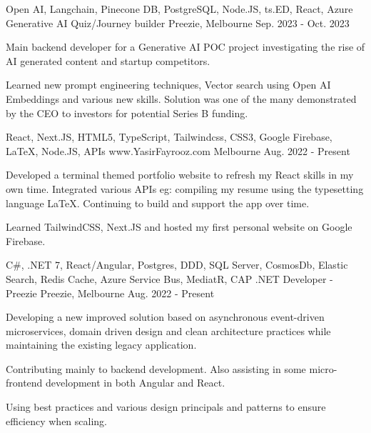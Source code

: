 

\vspace{-0.5\baselineskip}
\begin{cventries}
  \cventry
    {Open AI, Langchain, Pinecone DB, PostgreSQL, Node.JS, ts.ED, React, Azure}
    {Generative AI Quiz/Journey builder}
    {Preezie, Melbourne}
    {Sep. 2023 - Oct. 2023}
    {
      \begin{cvitems}
        \item {Main backend developer for a Generative AI POC project investigating the rise of AI generated content and startup competitors.}
        \item {Learned new prompt engineering techniques, Vector search using Open AI Embeddings and various new skills. Solution was one of the many demonstrated by the CEO to investors for potential Series B funding.}
      \end{cvitems}
    }
  \cventry
    {React, Next.JS, HTML5, TypeScript, Tailwindcss, CSS3, Google Firebase, LaTeX, Node.JS, APIs }
    {www.YasirFayrooz.com}
    {Melbourne}
    {Aug. 2022 - Present}
    {
      \begin{cvitems}
        \item {Developed a terminal themed portfolio website to refresh my React skills in my own time. Integrated various APIs eg: compiling my resume using the typesetting language LaTeX. Continuing to build and support the app over time.}
        \item {Learned TailwindCSS, Next.JS and hosted my first personal website on Google Firebase.}
      \end{cvitems}
    }
  \cventry
    {C\#, .NET 7, React/Angular, Postgres, DDD, SQL Server, CosmosDb, Elastic Search, Redis Cache, Azure Service Bus, MediatR, CAP}
    {.NET Developer - Preezie}
    {Preezie, Melbourne}
    {Aug. 2022 - Present}
    {
      \begin{cvitems}
        \item {Developing a new improved solution based on asynchronous event-driven microservices, domain driven design and clean architecture practices while maintaining the existing legacy application.}
        \item {Contributing mainly to backend development. Also assisting in some micro-frontend development in both Angular and React.}
        \item {Using best practices and various design principals and patterns to ensure efficiency when scaling.}
	  \end{cvitems}
}
\end{cventries}

